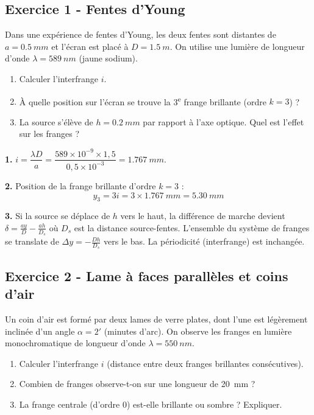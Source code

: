 \documentclass[12pt,a4paper]{article}
\begin{document}
\subsection*{Exercice 1 - Fentes d'Young \niveau{\facile}}

\begin{boiteexercice}
Dans une expérience de fentes d'Young, les deux fentes sont distantes de $a = \qty{0.5}{mm}$ et l'écran est placé à $D = \qty{1.5}{m}$. On utilise une lumière de longueur d'onde $\lambda = \qty{589}{nm}$ (jaune sodium).
\begin{enumerate}
  \item Calculer l'interfrange $i$.
  \item À quelle position sur l'écran se trouve la 3\textsuperscript{e} frange brillante (ordre $k=3$) ?
  \item La source s'élève de $h=\qty{0.2}{mm}$ par rapport à l'axe optique. Quel est l'effet sur les franges ?
\end{enumerate}
\end{boiteexercice}

\begin{boitecorrige}
\textbf{1.} $i = \dfrac{\lambda D}{a} = \dfrac{589\times10^{-9}\times1{,}5}{0{,}5\times10^{-3}} = \qty{1.767}{mm}$.

\textbf{2.} Position de la frange brillante d'ordre $k=3$ :
\[
y_3 = 3i = 3\times\qty{1.767}{mm} = \qty{5.30}{mm}
\]

\textbf{3.} Si la source se déplace de $h$ vers le haut, la différence de marche devient $\delta = \frac{ay}{D} - \frac{ah}{D_s}$ où $D_s$ est la distance source-fentes. L'ensemble du système de franges se translate de $\Delta y = -\frac{Dh}{D_s}$ vers le bas. La périodicité (interfrange) est inchangée.
\end{boitecorrige}

\subsection*{Exercice 2 - Lame à faces parallèles et coins d'air \niveau{\moyen}}

\begin{boiteexercice}
Un coin d'air est formé par deux lames de verre plates, dont l'une est légèrement inclinée d'un angle $\alpha = 2'$ (minutes d'arc). On observe les franges en lumière monochromatique de longueur d'onde $\lambda = \qty{550}{nm}$.
\begin{enumerate}
  \item Calculer l'interfrange $i$ (distance entre deux franges brillantes consécutives).
  \item Combien de franges observe-t-on sur une longueur de \qty{20}{mm} ?
  \item La frange centrale (d'ordre 0) est-elle brillante ou sombre ? Expliquer.
\end{enumerate}
\end{boiteexercice}
\end{document}
